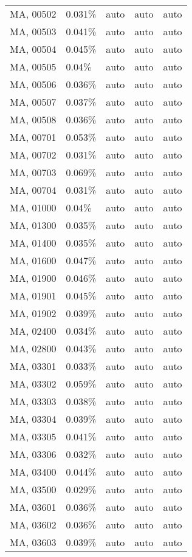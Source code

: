 \begin{longtable}[]{@{}lllll@{}}
MA, 00502 & 0.031\% & auto & auto & auto \\
MA, 00503 & 0.041\% & auto & auto & auto \\
MA, 00504 & 0.045\% & auto & auto & auto \\
MA, 00505 & 0.04\% & auto & auto & auto \\
MA, 00506 & 0.036\% & auto & auto & auto \\
MA, 00507 & 0.037\% & auto & auto & auto \\
MA, 00508 & 0.036\% & auto & auto & auto \\
MA, 00701 & 0.053\% & auto & auto & auto \\
MA, 00702 & 0.031\% & auto & auto & auto \\
MA, 00703 & 0.069\% & auto & auto & auto \\
MA, 00704 & 0.031\% & auto & auto & auto \\
MA, 01000 & 0.04\% & auto & auto & auto \\
MA, 01300 & 0.035\% & auto & auto & auto \\
MA, 01400 & 0.035\% & auto & auto & auto \\
MA, 01600 & 0.047\% & auto & auto & auto \\
MA, 01900 & 0.046\% & auto & auto & auto \\
MA, 01901 & 0.045\% & auto & auto & auto \\
MA, 01902 & 0.039\% & auto & auto & auto \\
MA, 02400 & 0.034\% & auto & auto & auto \\
MA, 02800 & 0.043\% & auto & auto & auto \\
MA, 03301 & 0.033\% & auto & auto & auto \\
MA, 03302 & 0.059\% & auto & auto & auto \\
MA, 03303 & 0.038\% & auto & auto & auto \\
MA, 03304 & 0.039\% & auto & auto & auto \\
MA, 03305 & 0.041\% & auto & auto & auto \\
MA, 03306 & 0.032\% & auto & auto & auto \\
MA, 03400 & 0.044\% & auto & auto & auto \\
MA, 03500 & 0.029\% & auto & auto & auto \\
MA, 03601 & 0.036\% & auto & auto & auto \\
MA, 03602 & 0.036\% & auto & auto & auto \\
MA, 03603 & 0.039\% & auto & auto & auto \\

\end{longtable}
